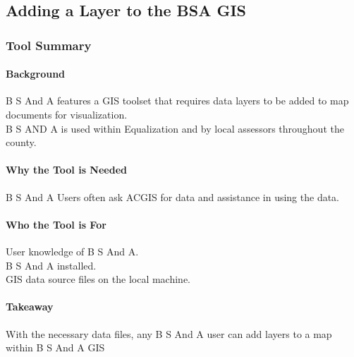 %
%
%

% 
\subsection{Adding a Layer to the BSA GIS}
\subsubsection{Tool Summary}
\begin{adjmulticols}{2}{\innerMar}{\outerMar}
\paragraph{Background}
B S And A features a GIS toolset that requires data layers to be added to map documents for visualization.\\

\noindent B S AND A is used within Equalization and by local assessors throughout the county.
\paragraph{Why the Tool is Needed}
B S And A Users often ask ACGIS for data and assistance in using the data.
\paragraph{Who the Tool is For}
User knowledge of B S And A.\\

\noindent B S And A installed.\\

\noindent GIS data source files on the local machine.
\paragraph{Takeaway}
With the necessary data files, any B S And A user can add layers to a map within B S And A GIS
\end{adjmulticols}
\clearpage


